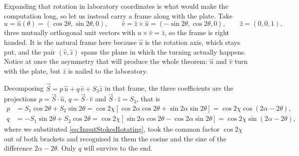             Expanding that rotation in laboratory coordinates is what would make the computation long, so let us instead carry a frame along with the plate. Take
            \begin{equation}\label{eq:MovingFrame}
                \hat{u} = \hat{n}(\theta) = \left(\cos2\theta,\sin2\theta,0\right), \qquad
                \hat{v} = \hat{z}\times\hat{u} = \left(-\sin2\theta,\cos2\theta,0\right), \qquad
                \hat{z} = \left(0,0,1\right),
            \end{equation}
            three mutually orthogonal unit vectors with $\hat{u}\times\hat{v}=\hat{z}$, so the frame is right handed. It is the natural frame here because $\hat{u}$ is the rotation axis, which stays put, and the pair $\left(\hat{v},\hat{z}\right)$ spans the plane in which the turning actually happens. Notice at once the asymmetry that will produce the whole theorem: $\hat{u}$ and $\hat{v}$ turn with the plate, but $\hat{z}$ is nailed to the laboratory.

            Decomposing $\vec{S}=p\,\hat{u}+q\,\hat{v}+S_3\hat{z}$ in that frame, the three coefficients are the projections $p=\vec{S}\cdot\hat{u}$, $q=\vec{S}\cdot\hat{v}$ and $\vec{S}\cdot\hat{z}=S_3$, that is
            \begin{align*}
                p &= S_1\cos2\theta+S_2\sin2\theta = \cos2\chi\left[\cos2\alpha\cos2\theta+\sin2\alpha\sin2\theta\right] = \cos2\chi\cos\left(2\alpha-2\theta\right), \\
                q &= -S_1\sin2\theta+S_2\cos2\theta = \cos2\chi\left[\sin2\alpha\cos2\theta-\cos2\alpha\sin2\theta\right] = \cos2\chi\sin\left(2\alpha-2\theta\right),
            \end{align*}
            where we substituted \ref{eq:InputStokesRotating}, took the common factor $\cos2\chi$ out of both brackets and recognised in them the cosine and the sine of the difference $2\alpha-2\theta$. Only $q$ will survive to the end.

